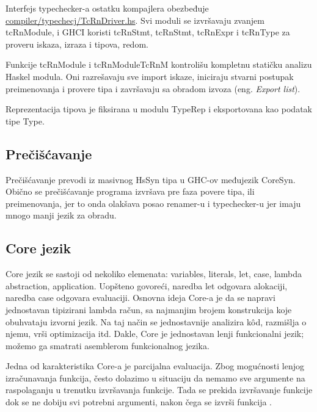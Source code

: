 Interfejs typechecker-a ostatku kompajlera obezbeđuje \\ \underline{compiler/typechecj/TcRnDriver.hs}. Svi moduli se izvršavaju zvanjem tcRnModule, i GHCI koristi tcRnStmt, tcRnStmt, tcRnExpr 
i tcRnType za proveru iskaza, izraza i tipova, redom.

Funkcije tcRnModule i tcRnModuleTcRnM kontrolišu kompletnu statičku analizu Haskel modula. Oni razrešavaju sve import iskaze, iniciraju stvarni postupak preimenovanja i provere tipa i završavaju sa obradom izvoza (eng. \emph{Export list}).

Reprezentacija tipova je fiksirana u modulu TypeRep i eksportovana kao podatak tipe Type.

\subsection{Prečišćavanje}
\label{subsec:podnaslovDesugar}

Prečišćavanje prevodi iz masivnog HsSyn tipa u GHC-ov međujezik CoreSyn. Obično se prečišćavanje programa izvršava pre faza povere tipa, ili preimenovanja, jer to onda olakšava posao renamer-u i typechecker-u jer imaju mnogo manji jezik za obradu.

\subsection{Core jezik}
\label{subsec:podnaslovCore}

Core jezik se sastoji od nekoliko elemenata: variables, literals, let, case, lambda abstraction, application. 
Uopšteno govoreći, naredba let odgovara alokaciji, naredba case odgovara evaluaciji.
Osnovna ideja Core-a je da se napravi jednostavan tipizirani lambda račun, sa najmanjim brojem konstrukcija koje obuhvataju izvorni jezik. Na taj način se jednostavnije analizira k\^{o}d, razmišlja o njemu, vrši optimizacija itd.
Dakle, Core je jednostavan lenji funkcionalni jezik; možemo ga smatrati asemblerom funkcionalnog jezika.

Jedna od karakteristika Core-a je parcijalna evaluacija. Zbog mogućnosti lenjog izračunavanja funkcija, često dolazimo u situaciju da nemamo sve argumente na raspolaganju u trenutku izvršavanja funkcije. Tada se prekida izvršavanje funkcije dok se ne dobiju svi potrebni argumenti, nakon čega se izvrši funkcija \cite{Launchbury}. 
